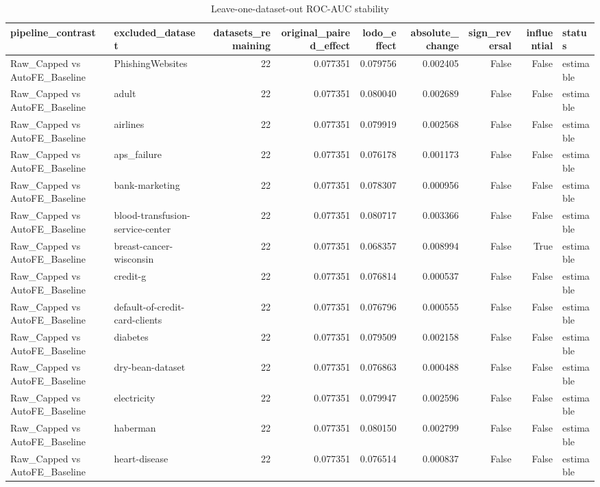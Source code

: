 \begin{table}
\caption{Leave-one-dataset-out ROC-AUC stability}
\begin{tabular}{llrrrrrrl}
\toprule
pipeline\_contrast & excluded\_dataset & datasets\_remaining & original\_paired\_effect & lodo\_effect & absolute\_change & sign\_reversal & influential & status \\
\midrule
Raw\_Capped vs AutoFE\_Baseline & PhishingWebsites & 22 & 0.077351 & 0.079756 & 0.002405 & False & False & estimable \\
Raw\_Capped vs AutoFE\_Baseline & adult & 22 & 0.077351 & 0.080040 & 0.002689 & False & False & estimable \\
Raw\_Capped vs AutoFE\_Baseline & airlines & 22 & 0.077351 & 0.079919 & 0.002568 & False & False & estimable \\
Raw\_Capped vs AutoFE\_Baseline & aps\_failure & 22 & 0.077351 & 0.076178 & 0.001173 & False & False & estimable \\
Raw\_Capped vs AutoFE\_Baseline & bank-marketing & 22 & 0.077351 & 0.078307 & 0.000956 & False & False & estimable \\
Raw\_Capped vs AutoFE\_Baseline & blood-transfusion-service-center & 22 & 0.077351 & 0.080717 & 0.003366 & False & False & estimable \\
Raw\_Capped vs AutoFE\_Baseline & breast-cancer-wisconsin & 22 & 0.077351 & 0.068357 & 0.008994 & False & True & estimable \\
Raw\_Capped vs AutoFE\_Baseline & credit-g & 22 & 0.077351 & 0.076814 & 0.000537 & False & False & estimable \\
Raw\_Capped vs AutoFE\_Baseline & default-of-credit-card-clients & 22 & 0.077351 & 0.076796 & 0.000555 & False & False & estimable \\
Raw\_Capped vs AutoFE\_Baseline & diabetes & 22 & 0.077351 & 0.079509 & 0.002158 & False & False & estimable \\
Raw\_Capped vs AutoFE\_Baseline & dry-bean-dataset & 22 & 0.077351 & 0.076863 & 0.000488 & False & False & estimable \\
Raw\_Capped vs AutoFE\_Baseline & electricity & 22 & 0.077351 & 0.079947 & 0.002596 & False & False & estimable \\
Raw\_Capped vs AutoFE\_Baseline & haberman & 22 & 0.077351 & 0.080150 & 0.002799 & False & False & estimable \\
Raw\_Capped vs AutoFE\_Baseline & heart-disease & 22 & 0.077351 & 0.076514 & 0.000837 & False & False & estimable \\

\end{tabular}
\end{table}
